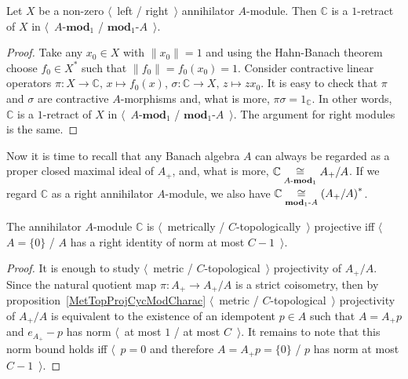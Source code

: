\begin{proposition}\label{AnnihCModIsRetAnnihMod} Let $X$ be a non-zero
$\langle$~left / right~$\rangle$ annihilator $A$-module. Then $\mathbb{C}$ is
a $1$-retract of $X$ in $\langle$~$A\text{-}\mathbf{mod}_1$ / $\mathbf{mod}_1\text{-}A$~$\rangle$.
\end{proposition}
\begin{proof} Take any $x_0\in X$ with $\lVert x_0\rVert=1$ and using the Hahn-Banach
theorem choose $f_0\in X^*$ such that $\lVert f_0\rVert=f_0(x_0)=1$. Consider
contractive linear operators $\pi:X\to \mathbb{C},\, x\mapsto f_0(x)$,
$\sigma:\mathbb{C}\to X,\, z\mapsto zx_0$. It is easy to check that $\pi$ and
$\sigma$ are contractive $A$-morphisms and, what is more,
$\pi\sigma=1_\mathbb{C}$. In other words, $\mathbb{C}$ is a $1$-retract of $X$ in
$\langle$~$A\text{-}\mathbf{mod}_1$ / $\mathbf{mod}_1\text{-}A$~$\rangle$. The argument for
right modules is the same.
\end{proof}

Now it is time to recall that any Banach algebra $A$ can always be regarded as a 
proper closed maximal ideal of $A_+$, and, what is more,
$\mathbb{C}\mathrel{\mathop{\cong}\limits_{A\text{-}\mathbf{mod}_1}} A_+/A$. If we regard $\mathbb{C}$ as a right
annihilator $A$-module, we also have
$\mathbb{C}\mathrel{\mathop{\cong}\limits_{\mathbf{mod}_1\text{-}A}}{(A_+/A)}^*$. 

\begin{proposition}\label{MetTopProjModCCharac} The annihilator $A$-module
$\mathbb{C}$ is $\langle$~metrically / $C$-topologically~$\rangle$ projective
iff $\langle$~$A= \{0 \}$ / $A$ has a right identity of norm at most
$C-1$~$\rangle$.
\end{proposition}
\begin{proof} 
It is enough to study $\langle$~metric / $C$-topological~$\rangle$ projectivity
of $A_+/A$. Since the natural quotient map $\pi:A_+\to A_+/A$ is a strict
coisometry, then by proposition~\ref{MetTopProjCycModCharac} $\langle$~metric /
$C$-topological~$\rangle$ projectivity of $A_+/A$ is equivalent to the existence of 
an idempotent $p\in A$ such that $A=A_+p$ and $e_{A_+}-p$ has norm $\langle$~at
most $1$ / at most $C$~$\rangle$. It remains to note that this norm bound holds
iff $\langle$~$p=0$ and therefore $A=A_+p= \{0 \}$ / $p$ has norm at most
$C-1$~$\rangle$.
\end{proof}

